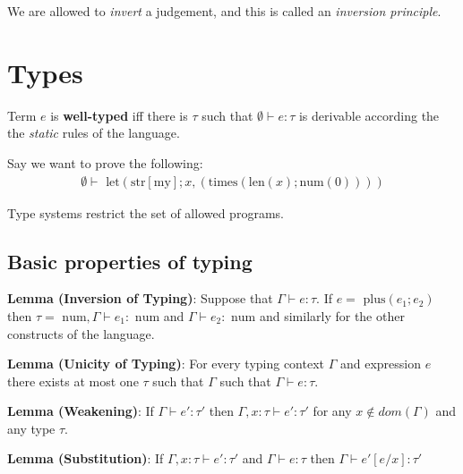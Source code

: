 \documentclass[11pt,a4paper,titlepage,dvipsnames,cmyk]{scrartcl}
\begin{document}
We are allowed to \textit{invert} a judgement, and this is called an \textit{inversion principle}.

\section{Types}
Term $e$ is \textbf{well-typed} iff there is $\tau$ such that $\emptyset \vdash e : \tau$ is derivable according the the \textit{static} rules of the language.

Say we want to prove the following:
\begin{align*}
\emptyset \vdash \text{ let}(\text{str} [ \text{my} ]; x, (\text{times}(\text{len}(x); \text{num}(0))))
\end{align*}

Type systems restrict the set of allowed programs.

\subsection{Basic properties of typing}
\textbf{Lemma (Inversion of Typing)}: Suppose that $\Gamma \vdash e : \tau$. If $e = \text{ plus}(e_1 ;e_2)$ then $\tau = \text{ num}, \Gamma \vdash e_1 : \text{ num}$ and $\Gamma \vdash e_2 : \text{ num}$ and similarly for the other constructs of the language.

\textbf{Lemma (Unicity of Typing)}: For every typing context $\Gamma$ and expression $e$ there exists at most one $\tau$ such that $\Gamma$ such that $\Gamma \vdash e : \tau$.

\textbf{Lemma (Weakening)}: If $\Gamma \vdash e' : \tau'$ then $\Gamma, x : \tau \vdash e' : \tau'$ for any $x \not \in dom(\Gamma)$ and any type $\tau$.

\textbf{Lemma (Substitution)}: If $\Gamma, x : \tau \vdash e' : \tau'$ and $\Gamma \vdash e : \tau$ then $\Gamma \vdash e'[e/x] : \tau '$
\end{document}
